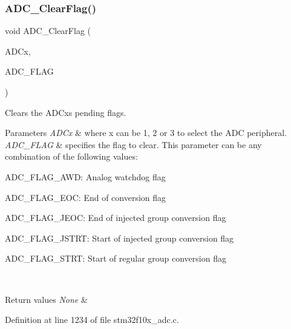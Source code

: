 \subsubsection{\texorpdfstring{A\+D\+C\+\_\+\+Clear\+Flag()}{ADC\_ClearFlag()}}
{\footnotesize\ttfamily void A\+D\+C\+\_\+\+Clear\+Flag (\begin{DoxyParamCaption}\item[{\hyperlink{struct_a_d_c___type_def}{A\+D\+C\+\_\+\+Type\+Def} $\ast$}]{A\+D\+Cx,  }\item[{uint8\+\_\+t}]{A\+D\+C\+\_\+\+F\+L\+AG }\end{DoxyParamCaption})}



Clears the A\+D\+Cx\textquotesingle{}s pending flags. 


\begin{DoxyParams}{Parameters}
{\em A\+D\+Cx} & where x can be 1, 2 or 3 to select the A\+DC peripheral. \\
\hline
{\em A\+D\+C\+\_\+\+F\+L\+AG} & specifies the flag to clear. This parameter can be any combination of the following values\+: \begin{DoxyItemize}
\item A\+D\+C\+\_\+\+F\+L\+A\+G\+\_\+\+A\+WD\+: Analog watchdog flag \item A\+D\+C\+\_\+\+F\+L\+A\+G\+\_\+\+E\+OC\+: End of conversion flag \item A\+D\+C\+\_\+\+F\+L\+A\+G\+\_\+\+J\+E\+OC\+: End of injected group conversion flag \item A\+D\+C\+\_\+\+F\+L\+A\+G\+\_\+\+J\+S\+T\+RT\+: Start of injected group conversion flag \item A\+D\+C\+\_\+\+F\+L\+A\+G\+\_\+\+S\+T\+RT\+: Start of regular group conversion flag \end{DoxyItemize}
\\
\hline
\end{DoxyParams}

\begin{DoxyRetVals}{Return values}
{\em None} & \\
\hline
\end{DoxyRetVals}


Definition at line 1234 of file stm32f10x\+\_\+adc.\+c.

\mbox{\label{group___a_d_c___private___functions_ga601c6a67bd883eb631ecc7aa5e999b9c}} 
